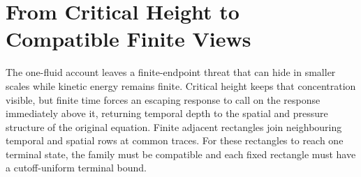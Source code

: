 
\section{From Critical Height to Compatible Finite Views}\label{sec:FromCriticalHeightToCompatibleFiniteViews}

The one-fluid account leaves a finite-endpoint threat that can hide in smaller scales while kinetic energy remains finite.
Critical height keeps that concentration visible, but finite time forces an escaping response to call on the response immediately above it, returning temporal depth to the spatial and pressure structure of the original equation.
Finite adjacent rectangles join neighbouring temporal and spatial rows at common traces.
For these rectangles to reach one terminal state, the family must be compatible and each fixed rectangle must have a cutoff-uniform terminal bound.








